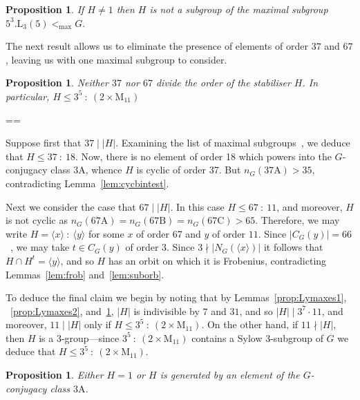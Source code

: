 \documentclass[11pt, a4paper]{amsart}
\makeatletter
\def\cn{\mathord{{\!\:{:}\:\!}}}
\newtheorem{prop}[thm]{Proposition}
\renewcommand{\proofname}{Proof}
\renewenvironment{proof}[1][\proofname]{\par
  \pushQED{\qed}  \normalfont \partopsep=\z@skip \topsep=\z@skip
  \trivlist
  \item[\hskip\labelsep
        \scshape
    #1\@addpunct{.}]\ignorespaces
}{  \popQED\endtrivlist\@endpefalse
}
\makeatother
\begin{document}
\begin{prop}\label{prop:Lymax3}
    If $H\ne 1$ then $H$ is not a subgroup of the maximal subgroup $5^3.\mathrm{L}_3(5)<_{\max}G.$
\end{prop}

The next result allows us to eliminate the presence of elements of order $37$ and $67$, leaving us with one maximal subgroup to consider.

\begin{prop}
    Neither $37$ nor $67$ divide the order of the stabiliser $H$. In particular, $H\leq3^5\cn(2\times\mathrm{M}_{11})$
\end{prop}
\begin{proof}
    Suppose first that $37\mid |H|$. Examining the list of maximal subgroups~\cite{atlas}, we deduce that $H\leq37\cn18$. Now, there is no element of order 18 which powers into the $G$-conjugacy class $\mathrm{3A}$, whence $H$ is cyclic of order 37. But $n_G(\mathrm{37A})>35$, contradicting Lemma~\ref{lem:cycbintest}.

    Next we consider the case that $67\mid |H|$. In this case $H\leq 67\cn11$, and moreover, $H$ is not cyclic as $n_G(\mathrm{67A})=n_G(\mathrm{67B})=n_G(\mathrm{67C})>65$. Therefore, we may write $H=\langle x\rangle\cn\langle y\rangle$ for some $x$ of order 67 and $y$ of order $11$.  Since $|C_G(y)|=66$~\cite{atlas}, we may take $t\in C_G(y)$ of order $3$. Since $3\nmid |N_G(\langle x\rangle)|$ it follows that $H\cap H^t=\langle y\rangle$, and so $H$ has an orbit on which it is Frobenius, contradicting Lemmas~\ref{lem:frob} and~\ref{lem:suborb}.

    To deduce the final claim we begin by noting that by Lemmas~\ref{prop:Lymaxes1}, ~\ref{prop:Lymaxes2}, and~\ref{prop:Lymax3}, $|H|$ is indivisible by $7$ and $31$, and so $|H|\mid 3^7\cdot 11$, and moreover, $11\mid |H|$ only if $H\leq 3^5\cn(2\times\mathrm{M}_{11})$. On the other hand, if $11\nmid |H|$, then $H$ is a 3-group---since $3^5\cn(2\times\mathrm{M}_{11})$ contains a Sylow 3-subgroup of $G$ we deduce that $H\leq 3^5\cn(2\times\mathrm{M}_{11})$. 
\end{proof}
\begin{prop}
    Either $H=1$ or $H$ is generated by an element of the $G$-conjugacy class $\mathrm{3A}$.
\end{prop}
\end{document}
